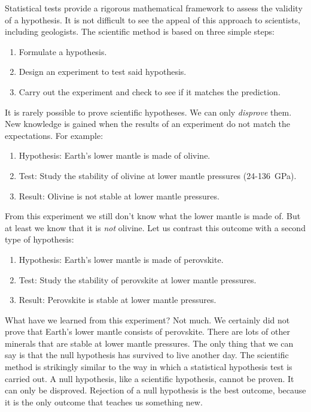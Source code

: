 Statistical tests provide a rigorous mathematical framework to assess
the validity of a hypothesis. It is not difficult to see the appeal of
this approach to scientists, including geologists. The scientific
method is based on three simple steps:

\begin{enumerate}
\item Formulate a hypothesis.
\item Design an experiment to test said hypothesis.
\item Carry out the experiment and check to see if it matches the prediction.
\end{enumerate}

It is rarely possible to prove scientific hypotheses. We can only
\emph{disprove} them. New knowledge is gained when the results of an
experiment do not match the expectations. For example:

\begin{enumerate}
\item Hypothesis: Earth's lower mantle is made of olivine.
\item Test: Study the stability of olivine at lower mantle pressures
  (24-136~GPa).
\item Result: Olivine is not stable at lower mantle pressures.
\end{enumerate}

From this experiment we still don't know what the lower mantle is made
of.  But at least we know that it is \emph{not} olivine. Let us
contrast this outcome with a second type of hypothesis:

\begin{enumerate}
\item Hypothesis: Earth's lower mantle is made of perovskite.
\item Test: Study the stability of perovskite at lower mantle
  pressures.
\item Result: Perovskite is stable at lower mantle pressures.
\end{enumerate}

What have we learned from this experiment? Not much. We certainly did
not prove that Earth's lower mantle consists of perovskite. There are
lots of other minerals that are stable at lower mantle pressures. The
only thing that we can say is that the null hypothesis has survived to
live another day. The scientific method is strikingly similar to the
way in which a statistical hypothesis test is carried out. A null
hypothesis, like a scientific hypothesis, cannot be proven. It can
only be disproved. Rejection of a null hypothesis is the best outcome,
because it is the only outcome that teaches us something new.\\

